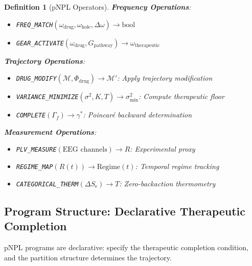 \documentclass[twocolumn,10pt]{article}
\newtheorem{definition}[theorem]{Definition}
\theoremstyle{remark}
\newcommand{\Se}{S_{\mathrm{e}}}
\newcommand{\Rorder}{R}
\newcommand{\Mstate}{\mathcal{M}}
\newcommand{\Gstate}{\Gamma}
\begin{document}
\begin{definition}[pNPL Operators]
\textbf{Frequency Operations}:
\begin{itemize}[nosep]
  \item \texttt{FREQ\_MATCH}$(\omega_{\mathrm{drug}}, \omega_{\mathrm{hole}}, \Delta\omega) \to \text{bool}$
  \item \texttt{GEAR\_ACTIVATE}$(\omega_{\mathrm{drug}}, G_{\mathrm{pathway}}) \to \omega_{\mathrm{therapeutic}}$
\end{itemize}

\textbf{Trajectory Operations}:
\begin{itemize}[nosep]
  \item \texttt{DRUG\_MODIFY}$(\Mstate, \Phi_{\mathrm{drug}}) \to \Mstate'$: Apply trajectory modification
  \item \texttt{VARIANCE\_MINIMIZE}$(\sigma^2, K, T) \to \sigma^2_{\min}$: Compute therapeutic floor
  \item \texttt{COMPLETE}$(\Gstate_f) \to \gamma^*$: Poincar\'e backward determination
\end{itemize}

\textbf{Measurement Operations}:
\begin{itemize}[nosep]
  \item \texttt{PLV\_MEASURE}$(\text{EEG channels}) \to \Rorder$: Experimental proxy
  \item \texttt{REGIME\_MAP}$(\Rorder(t)) \to \text{Regime}(t)$: Temporal regime tracking
  \item \texttt{CATEGORICAL\_THERM}$(\Delta\Se) \to T$: Zero-backaction thermometry
\end{itemize}
\end{definition}

\subsection{Program Structure: Declarative Therapeutic Completion}

pNPL programs are declarative: specify the therapeutic completion condition, and the partition structure determines the trajectory.
\end{document}
